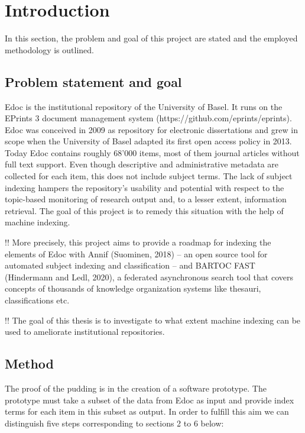 \hypertarget{introduction}{%
\section{Introduction}\label{introduction}}

In this section, the problem and goal of this project are stated and the
employed methodology is outlined.

\hypertarget{problem-statement-and-goal}{%
\subsection{Problem statement and
goal}\label{problem-statement-and-goal}}

Edoc is the institutional repository of the University of Basel. It runs
on the EPrints 3 document management system
(https://github.com/eprints/eprints). Edoc was conceived in 2009 as
repository for electronic dissertations and grew in scope when the
University of Basel adapted its first open access policy in 2013. Today
Edoc contains roughly 68'000 items, most of them journal articles
without full text support. Even though descriptive and administrative
metadata are collected for each item, this does not include subject
terms. The lack of subject indexing hampers the repository's usability
and potential with respect to the topic-based monitoring of research
output and, to a lesser extent, information retrieval. The goal of this
project is to remedy this situation with the help of machine indexing.

!! More precisely, this project aims to provide a roadmap for indexing
the elements of Edoc with Annif (Suominen, 2018) -- an open source tool
for automated subject indexing and classification -- and BARTOC FAST
(Hindermann and Ledl, 2020), a federated asynchronous search tool that
covers concepts of thousands of knowledge organization systems like
thesauri, classifications etc.

!! The goal of this thesis is to investigate to what extent machine
indexing can be used to ameliorate institutional repositories.

\hypertarget{method}{%
\subsection{Method}\label{method}}

The proof of the pudding is in the creation of a software prototype. The
prototype must take a subset of the data from Edoc as input and provide
index terms for each item in this subset as output. In order to fulfill
this aim we can distinguish five steps corresponding to sections 2 to 6
below:

